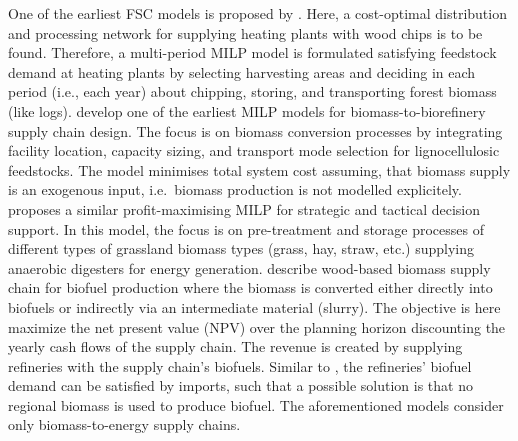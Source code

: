 \documentclass[APA,TimesLARGE]{WileyNJDv5} %
\begin{document}
One of the earliest FSC models is proposed by \cite{Gunnarsson2004}. Here, a cost-optimal distribution and processing network for supplying heating plants with wood chips is to be found. Therefore, a multi-period MILP model is formulated satisfying feedstock demand at heating plants by selecting harvesting areas and deciding in each period (i.e., each year) about chipping, storing, and transporting forest biomass (like logs). \cite{Eksioglu2009_Biorefinery_SC} develop one of the earliest MILP models for biomass-to-biorefinery supply chain design. The focus is on biomass conversion processes by integrating facility location, capacity sizing, and transport mode selection for lignocellulosic feedstocks. The model minimises total system cost assuming, that biomass supply is an exogenous input, i.e.~biomass production is not modelled explicitely. \cite{DeMeyer2016_tOPTIMASS} proposes a similar profit-maximising MILP for strategic and tactical decision support. In this model, the focus is on pre-treatment and storage processes of different types of grassland biomass types (grass, hay, straw, etc.) supplying anaerobic digesters for energy generation. \cite{walther2012design} describe wood-based biomass supply chain for biofuel production where the biomass is converted either directly into biofuels or indirectly via an intermediate material (slurry). The objective is here maximize the net present value (NPV) over the planning horizon discounting the yearly cash flows of the supply chain. The revenue is created by supplying refineries with the supply chain's biofuels. Similar to \cite{Gunnarsson2004}, the refineries' biofuel demand can be satisfied by imports, such that a possible solution is that no regional biomass is used to produce biofuel. The aforementioned models consider only biomass-to-energy supply chains.
\end{document}
